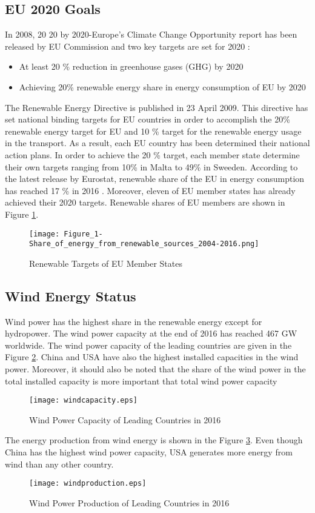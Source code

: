 \subsection{EU 2020 Goals}
In 2008, 20 20 by 2020-Europe's Climate Change Opportunity report has been released by EU Commission and two key targets are set for 2020 \cite{EuropeanCommission2008}: 
\begin{itemize}  
	\item At least 20 \% reduction in greenhouse gases (GHG) by 2020
	\item Achieving 20\% renewable energy share in energy consumption of EU by 2020
\end{itemize}
The Renewable Energy Directive is published in 23 April 2009. This directive has set national binding targets for EU countries in order to accomplish the 20\% renewable energy target for EU and 10 \% target for the renewable energy usage in the transport. \cite{EuropeanParliament2009} As a result, each EU country has been determined their national action plans. In order to achieve the 20 \% target, each member state determine their own targets ranging from 10\% in Malta to 49\% in Sweeden. 
According to the latest release by Eurostat, renewable share of the EU in energy consumption has reached 17 \% in 2016 \cite{States2016}. Moreover, eleven of EU member states has already achieved their 2020 targets. Renewable shares of EU members are shown in Figure \ref{EUtargets}.
\begin{figure}[h!]
	\centering
	\texttt{[image: Figure\_1-Share\_of\_energy\_from\_renewable\_sources\_2004-2016.png]}
	\caption{Renewable Targets of EU Member States\cite{States2016}}
	\label{EUtargets}
\end{figure}


\subsection{Wind Energy Status}
Wind power has the highest share in the renewable energy except for hydropower. The wind power capacity at the end of 2016 has reached 467 GW worldwide. The wind power capacity of the leading countries are given in the Figure \ref{windcap}. China and USA have also the highest installed capacities in the wind power. Moreover, it should also be noted that the share of the wind power in the total installed capacity is more important that total wind power capacity
\begin{figure}[h!]
	\centering
	\texttt{[image: windcapacity.eps]}
	\caption{Wind Power Capacity of Leading Countries in 2016\cite{InternationalRenewableEnergyAgency2017}}
	\label{windcap}
\end{figure}
The energy production from wind energy is shown in the Figure \ref{windpro}. Even though China has the highest wind power capacity,  USA generates more energy from wind than any other country. 
\begin{figure}[h!]
	\centering
	\texttt{[image: windproduction.eps]}
	\caption{Wind Power Production of Leading Countries in 2016\cite{InternationalRenewableEnergyAgency2017}}
	\label{windpro}
\end{figure}


